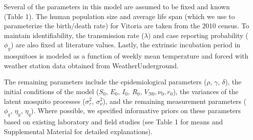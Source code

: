 \documentclass[10pt,letterpaper]{article}
\begin{document}
Several of the parameters in this model are assumed to be fixed and known (Table 1).
The human population size and average life span (which we use to parameterize the birth/death rate) for Vitoria are taken from the 2010 census.
To maintain identifiability, the transmission rate ($\lambda$) and case reporting probability ($\phi_y$) are also fixed at literature values.
Lastly, the extrinsic incubation period in mosquitoes is modeled as a function of weekly mean temperature and forced with weather station data obtained from WeatherUnderground.

The remaining parameters include the epidemiological parameters ($\rho$, $\gamma$, $\delta$), the initial conditions of the model ($S_0$, $E_0$, $I_0$, $R_0$, $V_{N0}, \nu_0, r_0$), the variances of the latent mosquito processes ($\sigma^2_r$, $\sigma^2_{\nu}$), and the remaining measurement parameters ($\phi_q$, $\eta_y$, $\eta_q$).  
Where possible, we specified informative priors on these parameters based on existing laboratory and field studies (see Table 1 for means and Supplemental Material for detailed explanations).
\end{document}
